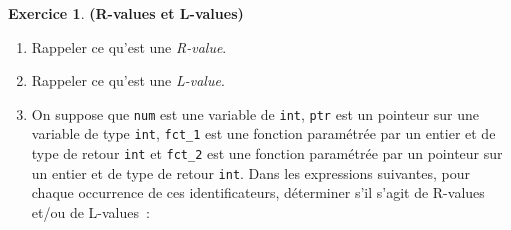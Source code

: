 \documentclass[12pt]{article}
\theoremstyle{definition}
\newtheorem{Exercice}{Exercice}
\begin{document}
\begin{Exercice} {\bf (R-values et L-values)}\smallskip
\begin{enumerate}
    \item Rappeler ce qu'est une {\em R-value}.
    \smallskip

    \item Rappeler ce qu'est une {\em L-value}.
    \smallskip

    \item On suppose que {\tt num} est une variable de {\tt int},
    {\tt ptr} est un pointeur sur une variable de type {\tt int},
    {\tt fct\_1} est une fonction paramétrée par un entier et de type 
    de retour {\tt int} et {\tt fct\_2} est une fonction paramétrée par 
    un pointeur sur un entier et de type de retour {\tt int}. Dans les 
    expressions suivantes, pour chaque occurrence de ces identificateurs,
    déterminer s'il s'agit de R-values et/ou de L-values~:
    \begin{enumerate}[label = ({\alph*})]
    \end{enumerate}
\end{enumerate}
\end{Exercice}
\bigskip
\end{document}
